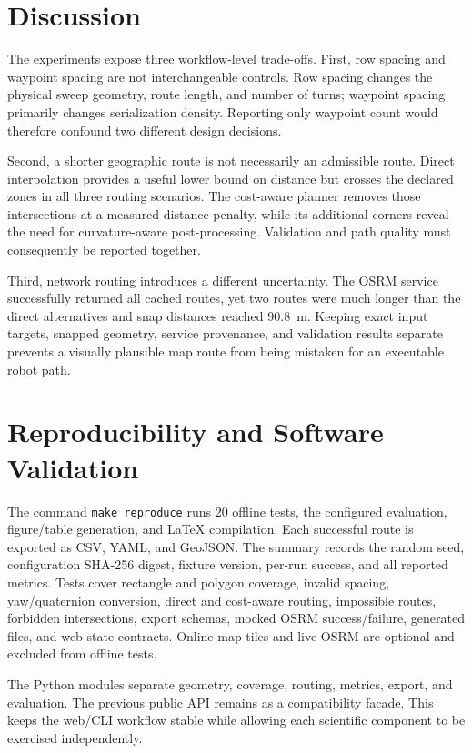 \documentclass[conference,a4paper]{IEEEtran}
\begin{document}
\section{Discussion}
The experiments expose three workflow-level trade-offs. First, row spacing and
waypoint spacing are not interchangeable controls. Row spacing changes the
physical sweep geometry, route length, and number of turns; waypoint spacing
primarily changes serialization density. Reporting only waypoint count would
therefore confound two different design decisions.

Second, a shorter geographic route is not necessarily an admissible route.
Direct interpolation provides a useful lower bound on distance but crosses the
declared zones in all three routing scenarios. The cost-aware planner removes
those intersections at a measured distance penalty, while its additional
corners reveal the need for curvature-aware post-processing. Validation and
path quality must consequently be reported together.

Third, network routing introduces a different uncertainty. The OSRM service
successfully returned all cached routes, yet two routes were much longer than
the direct alternatives and snap distances reached 90.8~m. Keeping exact input
targets, snapped geometry, service provenance, and validation results separate
prevents a visually plausible map route from being mistaken for an executable
robot path.

\section{Reproducibility and Software Validation}
The command \texttt{make reproduce} runs 20 offline tests, the configured
evaluation, figure/table generation, and LaTeX compilation. Each successful
route is exported as CSV, YAML, and GeoJSON. The summary records the random
seed, configuration SHA-256 digest, fixture version, per-run success, and all
reported metrics. Tests cover rectangle and polygon coverage, invalid spacing,
yaw/quaternion conversion, direct and cost-aware routing, impossible routes,
forbidden intersections, export schemas, mocked OSRM success/failure, generated
files, and web-state contracts. Online map tiles and live OSRM are optional and
excluded from offline tests.

The Python modules separate geometry, coverage, routing, metrics, export, and
evaluation. The previous public API remains as a compatibility facade. This
keeps the web/CLI workflow stable while allowing each scientific component to
be exercised independently.
\end{document}
